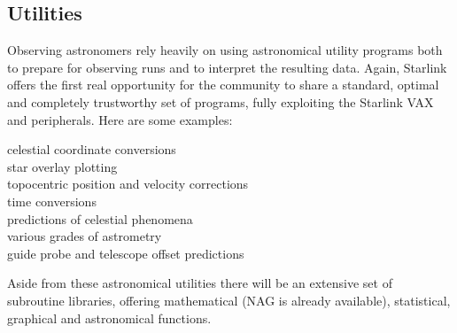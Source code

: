 \subsection {Utilities}
Observing astronomers rely heavily on using astronomical utility programs both
to prepare for observing runs and to interpret the resulting data.
Again, Starlink offers the first real opportunity for the community to share a
standard, optimal and completely trustworthy set of programs, fully exploiting
the Starlink VAX and peripherals.
Here are some examples:
\begin{description}
\begin{description}
\item [celestial coordinate conversions]
\item [star overlay plotting]
\item [topocentric position and velocity corrections]
\item [time conversions]
\item [predictions of celestial phenomena]
\item [various grades of astrometry]
\item [guide probe and telescope offset predictions]
\end{description}
\end{description}
Aside from these astronomical utilities there will be an extensive set of
subroutine libraries, offering mathematical (NAG is already available),
statistical, graphical and astronomical functions.
